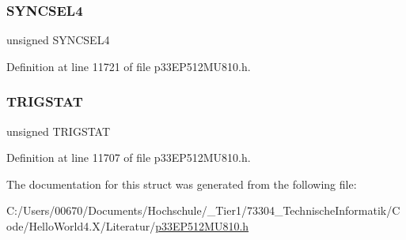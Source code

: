 \subsubsection{\texorpdfstring{S\+Y\+N\+C\+S\+E\+L4}{SYNCSEL4}}
{\footnotesize\ttfamily unsigned S\+Y\+N\+C\+S\+E\+L4}



Definition at line 11721 of file p33\+E\+P512\+M\+U810.\+h.

\mbox{\label{structtag_o_c9_c_o_n2_b_i_t_s_ab379549de54ac93ad4aa73686c34cb7c}} 
\subsubsection{\texorpdfstring{T\+R\+I\+G\+S\+T\+AT}{TRIGSTAT}}
{\footnotesize\ttfamily unsigned T\+R\+I\+G\+S\+T\+AT}



Definition at line 11707 of file p33\+E\+P512\+M\+U810.\+h.



The documentation for this struct was generated from the following file\+:\begin{DoxyCompactItemize}
\item 
C\+:/\+Users/00670/\+Documents/\+Hochschule/\+\_\+\+Tier1/73304\+\_\+\+Technische\+Informatik/\+Code/\+Hello\+World4.\+X/\+Literatur/\hyperlink{p33_e_p512_m_u810_8h}{p33\+E\+P512\+M\+U810.\+h}\end{DoxyCompactItemize}
